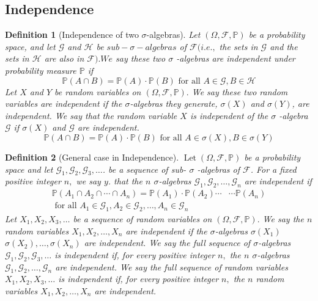 \documentclass[a4]{article}
\newtheorem{definition}{Definition}
\begin{document}
\subsection{Independence}
\begin{definition}[Independence of two $\sigma$-algebras]\par \bigbreak 
	Let $(\Omega, \mathcal{F}, \mathbb{P})$ be a probability space, and let $\mathcal{G}$ and $\mathcal{H}$ be $s u b-\sigma-a l g e b r a s$ of $\mathcal{F}(i . e .,$ the sets in $\mathcal{G}$ and the sets in $\mathcal{H}$ are also in $\mathcal{F}) . W e$ say these two $\sigma$ -algebras are independent under probability measure $\mathbb{P}$ if
	$$
	\mathbb{P}(A \cap B)=\mathbb{P}(A) \cdot \mathbb{P}(B) \text { for all } A \in \mathcal{G}, B \in \mathcal{H}
	$$
	Let $X$ and $Y$ be random variables on $(\Omega, \mathcal{F}, \mathbb{P}) .$ We say these two random variables are independent if the $\sigma$-algebras they generate, $\sigma(X)$ and $\sigma(Y)$, are independent. We say that the random variable $X$ is independent of the $\sigma$ -algebra $\mathcal{G}$ if $\sigma(X)$ and $\mathcal{G}$ are independent.
	$$
	\mathbb{P}(A \cap B)=\mathbb{P}(A) \cdot \mathbb{P}(B) \text { for all } A \in \sigma (X), B \in \sigma(Y)
	$$
\end{definition}
\begin{definition}[General case in Independence]
	$\operatorname{Let}(\Omega, \mathcal{F}, \mathbb{P})$ be a probability space and let $\mathcal{G}_{1}, \mathcal{G}_{2}, \mathcal{G}_{3}, \ldots$.
	be a sequence of sub- $\sigma$ -algebras of $\mathcal{F}$. For a fixed positive integer $n,$ we say $y$. that the $n$ $\sigma$-algebras $\mathcal{G}_{1}, \mathcal{G}_{2}, \ldots, \mathcal{G}_{n}$ are independent if
	$$
	\begin{aligned}
	\mathbb{P}\left(A_{1} \cap A_{2} \cap \cdots \cap A_{n}\right)=\mathbb{P}\left(A_{1}\right) \cdot \mathbb{P}\left(A_{2}\right) \cdots & \cdots \mathbb{P}\left(A_{n}\right) \\
	\text { for all } A_{1} \in \mathcal{G}_{1}, A_{2} \in \mathcal{G}_{2}, \ldots, A_{n} \in \mathcal{G}_{n}
	\end{aligned}
	$$
	Let $X_{1}, X_{2}, X_{3}, \ldots$ be a sequence of random variables on $(\Omega, \mathcal{F}, \mathbb{P}) .$ We say the $n$ random variables $X_{1}, X_{2}, \ldots, X_{n}$ are independent if the $\sigma$-algebras $\sigma\left(X_{1}\right)$ $\sigma\left(X_{2}\right), \ldots, \sigma\left(X_{n}\right)$ are independent. We say the full sequence of $\sigma$-algebras $\mathcal{G}_{1}, \mathcal{G}_{2}, \mathcal{G}_{3}, \ldots$ is independent if, for every positive integer $n,$ the $n$ $\sigma$-algebras $\mathcal{G}_{1}, \mathcal{G}_{2}, \ldots, \mathcal{G}_{n}$ are independent. We say the full sequence of random variables $X_{1}, X_{2}, X_{3}, \ldots$ is independent if, for every positive integer $n,$ the $n$ random variables $X_{1}, X_{2}, \ldots, X_{n}$ are independent.
\end{definition}
\end{document}
